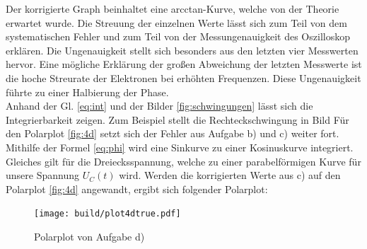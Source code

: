 Der korrigierte Graph beinhaltet eine arcctan-Kurve, welche von der Theorie 
erwartet wurde. Die Streuung der einzelnen Werte lässt sich zum Teil von dem 
systematischen Fehler und zum Teil von der Messungenauigkeit des Oszilloskop erklären.
Die Ungenauigkeit stellt sich besonders aus den letzten vier Messwerten hervor. 
Eine mögliche Erklärung der großen Abweichung der letzten Messwerte ist die hoche 
Streurate der Elektronen bei erhöhten Frequenzen. Diese Ungenauigkeit führte zu einer 
Halbierung der Phase.
\\


Anhand der Gl. \eqref{eq:int} und der Bilder \ref{fig:schwingungen} lässt sich die Integrierbarkeit
zeigen. Zum Beispiel stellt die Rechteckschwingung in Bild  
Für den Polarplot \ref{fig:4d} setzt sich der Fehler aus Aufgabe b) und c) weiter fort.
Mithilfe der Formel \eqref{eq:phi} wird eine Sinkurve zu einer Kosinuskurve integriert.
Gleiches gilt für die Dreiecksspannung, welche zu einer parabelförmigen
Kurve für unsere Spannung $U_C(t)$ wird.
Werden die korrigierten Werte aus c) auf den Polarplot \ref{fig:4d} angewandt, ergibt sich 
folgender Polarplot:

  \begin{figure}[H]
    \texttt{[image: build/plot4dtrue.pdf]}
    \centering
    \caption{Polarplot von Aufgabe d)}
    \label{fig:4dtrue}
  \end{figure}

\newpage
\nocite{V353}
\nocite{scipy}
\nocite{uncertainties}
\printbibliography
